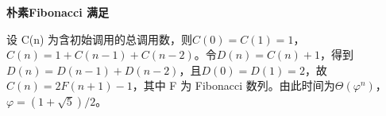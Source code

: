 {\color{ink}\bfseries 朴素Fibonacci 满足}\par\vspace{1bp}设 C(n) 为含初始调用的总调用数，则\(C(0)=\allowbreak{}C(1)=\allowbreak{}1\)，\(C(n)=\allowbreak{}1+\allowbreak{}C(n-1)+\allowbreak{}C(n-2)\)。令\(D(n)=\allowbreak{}C(n)+\allowbreak{}1\)，得到\(D(n)=\allowbreak{}D(n-1)+\allowbreak{}D(n-2)\)，且\(D(0)=\allowbreak{}D(1)=\allowbreak{}2\)，故\(C(n)=\allowbreak{}2F(n+\allowbreak{}1)-1\)，其中 F 为 Fibonacci 数列。由此时间为\(\Theta (\varphi ^{n})\)，\(\varphi =\allowbreak{}(1+\allowbreak{}\sqrt{5})/\allowbreak{}2\)。
